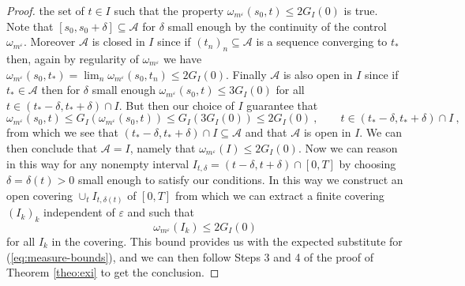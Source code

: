 \documentclass[11pt,reqno,oneside]{amsart}
\numberwithin{equation}{section}
\begin{document}
\begin{proof}
  the set of $t \in I$ such that the property $\omega_{m^{\varepsilon}} (s_0,
  t) \leqslant 2 G_I (0)$ is true. Note that $[s_0, s_0 + \delta] \subseteq
  \mathcal{A}$ for $\delta$ small enough by the continuity of the control
  $\omega_{m^{\varepsilon}}$. Moreover $\mathcal{A}$ is closed in $I$ since if
  $(t_n)_n \subseteq \mathcal{A}$ is a sequence converging to $t_{\ast}$ then,
  again by regularity of $\omega_{m^{\varepsilon}}$  we have
  $\omega_{m^{\varepsilon}} (s_0, t_{\ast}) = \lim_n \omega_{m^{\varepsilon}}
  (s_0, t_n) \leqslant 2 G_I (0)$. Finally $\mathcal{A}$ is also open in $I$
  since if $t_{\ast} \in \mathcal{A}$ then for $\delta$ small enough
  $\omega_{m^{\varepsilon}} (s_0, t) \leqslant 3 G_I (0)$ for all $t \in
  (t_{\ast} - \delta, t_{\ast} + \delta) \cap I$. But then our
  choice of $I$ guarantee that
  \[ \omega_{m^{\varepsilon}} (s_0, t) \leqslant G_I
     (\omega_{m^{\varepsilon}} (s_0, t)) \leqslant G_I (3 G_I (0)) \leqslant 2
     G_I (0) \ , \qquad t \in (t_{\ast} - \delta, t_{\ast} + \delta)
     \cap I \ , \]
  from which we see that $(t_{\ast} - \delta, t_{\ast} + \delta) \cap I
  \subseteq \mathcal{A}$ and that $\mathcal{A}$ is open in $I$. We can then
  conclude that $\mathcal{A}= I$, namely that $\omega_{m^{\varepsilon}} (I)
  \leqslant 2 G_I (0)$. 
  Now we can reason in this way for any nonempty interval $I_{t, \delta} = (t
  - \delta, t + \delta) \cap [0, T]$ by choosing $\delta = \delta (t) > 0$
  small enough to satisfy our conditions. In this way we construct an open
  covering $\cup_t I_{t, \delta (t)}$ of $[0, T]$ from which we can extract a
  finite covering $(I_k)_k$ independent of $\varepsilon$ and such that
$$
\omega_{m^{\varepsilon}} (I_k) \leqslant 2 G_I (0)
$$
for all $I_k$ in the covering. This bound provides us with the expected substitute for (\ref{eq:measure-bounds}), and we can then follow Steps 3 and 4 of the proof of Theorem \ref{theo:exi} to get the conclusion. 
\end{proof}
\end{document}
